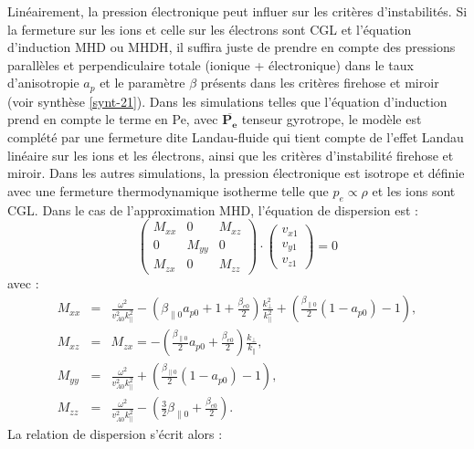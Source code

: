 Linéairement, la pression électronique peut influer sur les critères d'instabilités. Si la fermeture sur les ions et celle sur les électrons sont \acs{CGL} et l'équation d'induction \ac{MHD} ou \acs{MHDH}, il suffira juste de prendre en compte des pressions parallèles et perpendiculaire totale (ionique + électronique) dans le taux d'anisotropie $a_p$ et le paramètre $\beta$ présents dans les critères firehose et miroir (voir synthèse \ref{synt-21}). Dans les simulations telles que l'équation d'induction prend en compte le terme en \acl{Pe}, avec $\overline{\boldsymbol{P_{e}}}$ tenseur gyrotrope, le modèle est complété par une fermeture dite Landau-fluide qui tient compte de l'effet Landau linéaire sur les ions et les électrons, ainsi que les critères d'instabilité firehose et miroir. Dans les autres simulations, la pression électronique est isotrope et définie avec une fermeture thermodynamique isotherme telle que  $p_e \propto \rho$  et les ions sont \acs{CGL}. Dans le cas de l'approximation \acs{MHD}, l'équation de dispersion est : 
\begin{equation}
    \begin{pmatrix}
\label{eq:lin_cpgpe_eqdis}    M_{xx}  & 0 & M_{xz} \\
    0 & M_{yy}   & 0 \\
     M_{zx} & 0 & M_{zz} 
    \end{pmatrix} 
    \cdot \begin{pmatrix}
    v_{x1} \\ v_{y1} \\ v_{z1}
    \end{pmatrix} = 0
\end{equation}
avec : 
\begin{eqnarray*}
    M_{xx} &=& \frac{\omega^2}{v^2_{A0}k^2_{\parallel}} -  \left(\beta_{\parallel 0} a_{p0}+1 + \frac{\beta_{e0}}{2}\right)  \frac{k^2_{\perp}}{k^2_{\parallel}} +   \left(\frac{\beta_{\parallel 0}}{2} \left(1-a_{p0}\right)-1\right),\\
    M_{xz} &=&  M_{zx} = -  \left(\frac{\beta_{\parallel 0}}{2} a_{p0} + \frac{\beta_{e0}}{2}\right)\frac{k_{\perp}}{k_{\parallel}},\\
    M_{yy} &=&  \frac{\omega^2}{v^2_{A0}k^2_{\parallel}} +   \left(\frac{\beta_{\parallel 0}}{2} \left(1-a_{p0}\right)-1\right),\\
     M_{zz} &=& \frac{\omega^2}{ v^2_{A0}k^2_{\parallel}} -  \left(\frac{3}{2} \beta_{\parallel 0} + \frac{\beta_{e0}}{2}\right) .
\end{eqnarray*}
 La relation de dispersion s'écrit alors : 
